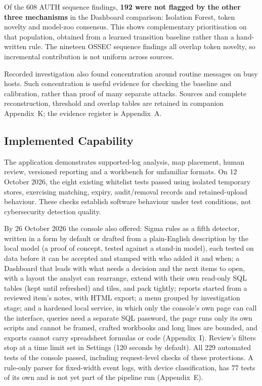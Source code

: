 \documentclass[11pt,a4paper]{article}
\begin{document}
Of the 608 AUTH sequence findings, \textbf{192 were not flagged by the other three mechanisms} in the Dashboard comparison: Isolation Forest, token novelty and model-zoo consensus. This shows complementary prioritisation on that population, obtained from a learned transition baseline rather than a hand-written rule. The nineteen OSSEC sequence findings all overlap token novelty, so incremental contribution is not uniform across sources.

Recorded investigation also found concentration around routine messages on busy hosts. Such concentration is useful evidence for checking the baseline and calibration, rather than proof of many separate attacks. Sources and complete reconstruction, threshold and overlap tables are retained in companion Appendix~K; the evidence register is Appendix~A.

\subsection{Implemented Capability}

The application demonstrates supported-log analysis, map placement, human review, versioned reporting and a workbench for unfamiliar formats. On 12 October 2026, the eight existing whitelist tests passed using isolated temporary stores, exercising matching, expiry, audit/removal records and retained-upload behaviour. These checks establish software behaviour under test conditions, not cybersecurity detection quality.

By 26 October 2026 the console also offered: Sigma rules as a fifth detector, written in a form by default or drafted from a plain-English description by the local model (a proof of concept, tested against a stand-in model), each tested on data before it can be accepted and stamped with who added it and when; a Dashboard that leads with what needs a decision and the next items to open, with a layout the analyst can rearrange, extend with their own read-only SQL tables (kept until refreshed) and tiles, and pack tightly; reports started from a reviewed item's notes, with HTML export; a menu grouped by investigation stage; and a hardened local service, in which only the console's own page can call the interface, queries need a separate SQL password, the page runs only its own scripts and cannot be framed, crafted workbooks and long lines are bounded, and exports cannot carry spreadsheet formulas or code (Appendix~I). Review's filters stop at a time limit set in Settings (120 seconds by default). All 229 automated tests of the console passed, including request-level checks of these protections. A rule-only parser for fixed-width event logs, with device classification, has 77 tests of its own and is not yet part of the pipeline run (Appendix~E).
\end{document}
